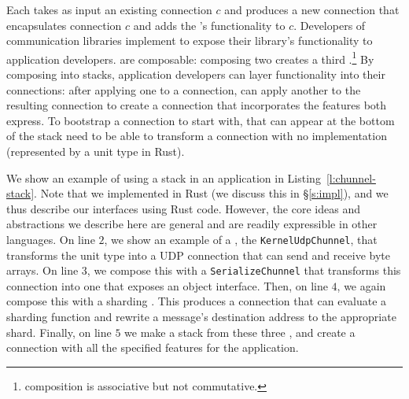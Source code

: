 Each \tunnel takes as input an existing connection $c$ and produces a new connection that encapsulates connection $c$ and adds the \tunnel's functionality to $c$.
Developers of communication libraries implement \tunnels to expose their library's functionality to application developers.
\tunnels are composable: composing two \tunnels creates a third \tunnel.\footnote{\tunnel composition is associative but not commutative.}
By composing \tunnels into \tunnel stacks, application developers can layer functionality into their connections: after applying one \tunnel to a connection, \name can apply another \tunnel to the resulting connection to create a connection that incorporates the features both \tunnels express.
To bootstrap a connection to start with, \tunnels that can appear at the bottom of the stack need to be able to transform a connection with no implementation (represented by a unit type in Rust).

We show an example of using a \tunnel stack in an application in Listing~\ref{l:chunnel-stack}.
Note that we implemented \name in Rust (we discuss this in \S\ref{s:impl}), and we thus describe our interfaces using Rust code. However, the core ideas and abstractions we describe here are general and are readily expressible in other languages.
On line $2$, we show an example of a \tunnel, the \texttt{KernelUdpChunnel}, that transforms the unit type into a UDP connection that can send and receive byte arrays.
On line $3$, we compose this with a \texttt{SerializeChunnel} that transforms this connection into one that exposes an object interface.
Then, on line $4$, we again compose this \tunnel with a sharding \tunnel. This produces a connection that can evaluate a sharding function and rewrite a message's destination address to the appropriate shard.
Finally, on line $5$ we make a \tunnel stack from these three \tunnels, and create a connection with all the specified features for the application.

